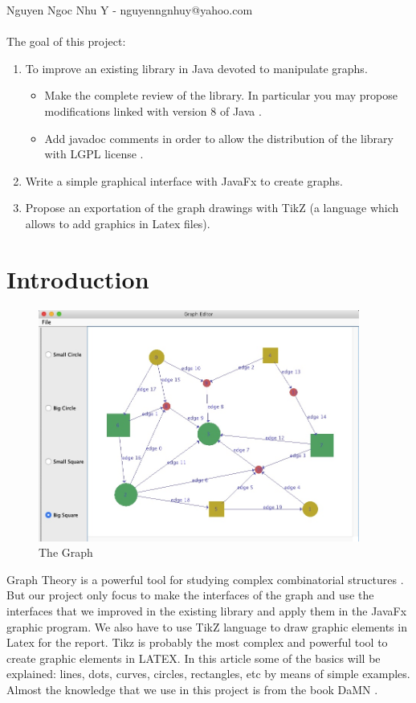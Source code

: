 \documentclass[a4paper,10pt]{article}
\begin{document}
Nguyen Ngoc Nhu Y - nguyenngnhuy@yahoo.com\\
\\
The goal of this project:
\begin{enumerate}
	\item To improve an existing library in Java devoted to manipulate graphs.
	\begin{itemize}
		\item Make the complete review of the library. In particular you may propose modifications linked with version 8 of Java \cite{cite-key5}.
		\item Add javadoc comments \cite{cite-key6} in order to allow the distribution of the library with LGPL license \cite{cite-key7}.
	\end{itemize}
	\item Write a simple graphical interface with JavaFx to create graphs.
	\item Propose an exportation of the graph drawings with TikZ (a language which allows to add graphics in Latex files).
\end{enumerate}
\cleardoublepage
%

\tableofcontents
\thispagestyle{empty}
\cleardoublepage
\setcounter{page}{1}
%

\section{Introduction}\label{sec:intro}
	\begin{figure}[H]
		\centering
		\includegraphics[height = 3in]{image1.jpg}
		\caption[Optional caption]{The Graph}
		\label{fig:Image1}
	\end{figure}
Graph Theory is a powerful tool for studying complex combinatorial structures \cite{cite-key1}. But our project only focus to make the interfaces of the graph and use the interfaces that we improved in the existing library and apply them in the JavaFx \cite{cite-key4} graphic program.
We also have to use TikZ language to draw graphic elements in Latex \cite{cite-key2} for the report. Tikz is probably the most complex and powerful tool to create graphic elements in LATEX. In this article some of the basics will be explained: lines, dots, curves, circles, rectangles, etc by means of simple examples.
Almost the knowledge that we use in this project is from the book DaMN \cite{cite-key3}.
%
\end{document}
